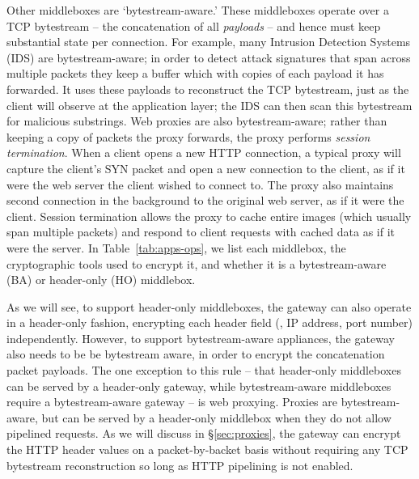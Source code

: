   Other middleboxes are `bytestream-aware.' These middleboxes operate over a TCP bytestream -- the concatenation of all {\it payloads} -- and hence must keep substantial state per connection.
  For example, many Intrusion Detection Systems (IDS) are bytestream-aware; in order to detect attack signatures that span across multiple packets they keep a buffer which with copies of each payload it has forwarded.
  It uses these payloads to reconstruct the TCP bytestream, just as the client will observe at the application layer; the IDS can then scan this bytestream for malicious substrings.
  Web proxies are also bytestream-aware; rather than keeping a copy of packets the proxy forwards, the proxy performs {\it session termination}. 
  When a client opens a new HTTP connection, a typical proxy will capture the client's SYN packet and open a new connection to the client, as if it were the web server the client wished to connect to. 
  The proxy also maintains second connection in the background to the original web server, as if it were the client. 
  Session termination allows the proxy to cache entire images (which usually span multiple packets) and respond to client requests with cached data as if it were the server.
  In Table~\ref{tab:apps-ops}, we list each middlebox, the cryptographic tools used to encrypt it, and whether it is a bytestream-aware (BA) or header-only (HO) middlebox.

  As we will see, to support header-only middleboxes, the \sys gateway can also operate in a header-only fashion, encrypting each header field (\eg{}, IP address, port number) independently.
  However, to support bytestream-aware appliances, the \sys gateway also needs to be be bytestream aware, in order to encrypt the concatenation packet payloads.
  The one exception to this rule -- that header-only middleboxes can be served by a header-only gateway, while bytestream-aware middleboxes require a bytestream-aware gateway -- is web proxying.
  Proxies are bytestream-aware, but can be served by a header-only middlebox when they do not allow pipelined requests.
  As we will discuss in \S\ref{sec:proxies}, the gateway can encrypt the HTTP header values on a packet-by-backet basis without requiring any TCP bytestream reconstruction so long as HTTP pipelining is not enabled. 


